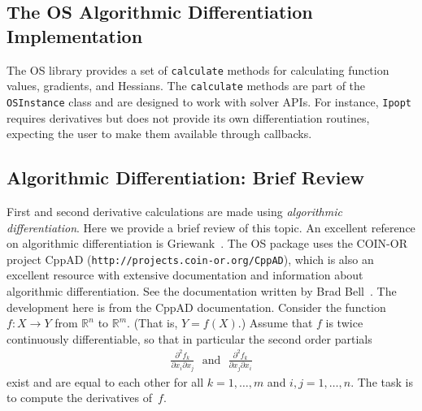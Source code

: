 \documentclass[11pt]{article}
\newcommand{\DD}[3]{ \frac{\partial^2 #1}{\partial #2 \partial #3} }
\renewcommand{\_}{{\char"5F}}
\renewcommand{\{}{{\char"7B}}
\renewcommand{\}}{{\char"7D}}
\renewcommand{\^}{{\char"0D}}
\renewcommand{\'}{{\char"0D}}
\newcommand{\UrlCppad}{http://projects.coin-or.org/CppAD}
\begin{document}
\begin{enumerate}[Step 1:]
\section{The OS Algorithmic Differentiation Implementation}\label{section:ad}

The OS library provides a set of {\tt calculate} methods for calculating  function values, gradients, and Hessians.
The {\tt calculate} methods are part of the {\tt OSInstance} class and are designed to work with solver APIs.
For instance, {\tt Ipopt} requires derivatives but does not provide its own differentiation routines, 
expecting the user to make them available through callbacks.


\subsection{Algorithmic Differentiation:  Brief Review}\label{section:adtheory}

First and second derivative calculations are made using 
{\it algorithmic differentiation}.
Here we provide a brief review of this topic.  An excellent reference on algorithmic differentiation
is Griewank~\cite{griewank2000}.  The OS package uses the COIN-OR project 
CppAD ({\tt\UrlCppad}), which  is also an excellent resource with extensive  
documentation and information about algorithmic differentiation.
See the documentation written by  Brad Bell~\cite{bell2007}.    
The development here is from the CppAD documentation.  
Consider the function $f:X \rightarrow Y$ from $ \mathbb{R}^{n}$ to $ \mathbb{R}^{m}$.
(That is, $Y = f(X).$) Assume that $f$ is twice continuously differentiable, so that in particular the second order 
partials
\begin{eqnarray}
\DD{f_{k}}{x_{i}}{x_{j}}\ \ \  \mbox{and}\ \ \     \DD{f_{k}}{x_{j}}{x_{i}} \label{eq:mixedPartials}
\end{eqnarray}
exist and are equal to each other for all $k=1,\ldots,m$ and $i,j=1,\ldots,n$. The task is to compute the derivatives 
of~$f$.
 

\end{enumerate}
\end{document}
